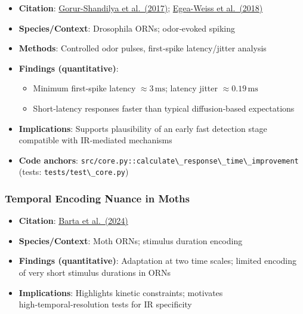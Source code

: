 \documentclass[
  13pt,
  a4paperpaper,
  12pt]{article}
\newcommand{\passthrough}[1]{#1}
\providecommand{\tightlist}{%
  \setlength{\itemsep}{0pt}\setlength{\parskip}{0pt}}
\begin{document}
\begin{itemize}
\tightlist
\item
  \textbf{Citation}:
  \href{https://elifesciences.org/articles/27670}{Gorur-Shandilya et
  al.~(2017)};
  \href{https://pmc.ncbi.nlm.nih.gov/articles/PMC6147046/}{Egea-Weiss et
  al.~(2018)}
\item
  \textbf{Species/Context}: Drosophila ORNs; odor‑evoked spiking
\item
  \textbf{Methods}: Controlled odor pulses, first‑spike latency/jitter
  analysis
\item
  \textbf{Findings (quantitative)}:

  \begin{itemize}
  \tightlist
  \item
    Minimum first‑spike latency \(\approx 3\,\mathrm{ms}\); latency
    jitter \(\approx 0.19\,\mathrm{ms}\)
  \item
    Short‑latency responses faster than typical diffusion‑based
    expectations
  \end{itemize}
\item
  \textbf{Implications}: Supports plausibility of an early fast
  detection stage compatible with IR‑mediated mechanisms
\item
  \textbf{Code anchors}:
  \passthrough{\lstinline!src/core.py::calculate\_response\_time\_improvement!}
  (tests: \passthrough{\lstinline!tests/test\_core.py!})
\end{itemize}

\subsubsection{Temporal Encoding Nuance in
Moths}\label{temporal-encoding-nuance-in-moths}

\begin{itemize}
\tightlist
\item
  \textbf{Citation}:
  \href{https://www.nature.com/articles/s42003-024-06921-z}{Barta et
  al.~(2024)}
\item
  \textbf{Species/Context}: Moth ORNs; stimulus duration encoding
\item
  \textbf{Findings (quantitative)}: Adaptation at two time scales;
  limited encoding of very short stimulus durations in ORNs
\item
  \textbf{Implications}: Highlights kinetic constraints; motivates
  high‑temporal‑resolution tests for IR specificity
\end{itemize}
\end{document}
